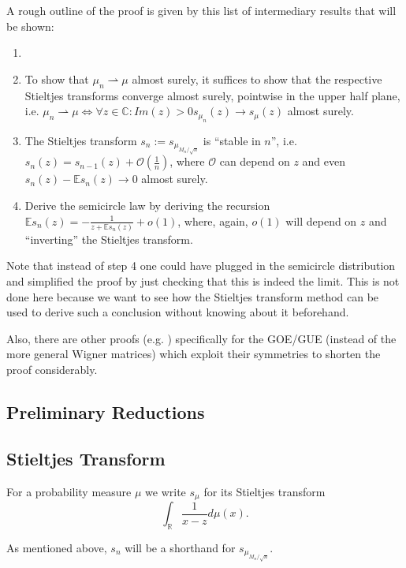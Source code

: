A rough outline of the proof is given by this list of intermediary results that will be shown:
\begin{enumerate}
	\item {}
	\item To show that $\mu_n\rightharpoonup\mu$ almost surely, it suffices to show that the respective Stieltjes transforms converge almost surely, pointwise in the upper half plane, i.e. $\mu_n\rightharpoonup\mu\Leftrightarrow\forall z\in\mathbb C:Im(z)>0 s_{\mu_n}(z)\rightarrow s_\mu(z)$ almost surely.
	\item The Stieltjes transform $s_n := s_{\mu_{M_n/\sqrt{n}}}$ is ``stable in $n$'', i.e. $s_n(z)=s_{n-1}(z)+\mathcal O(\frac{1}{n})$, where $\mathcal O$ can depend on $z$ and even $s_n(z)-\mathbb E s_n(z)\rightarrow 0$ almost surely.
	\item Derive the semicircle law by deriving the recursion $\mathbb E s_n(z)=-\frac{1}{z+\mathbb E s_n(z)}+o(1)$, where, again, $o(1)$ will depend on $z$ and ``inverting'' the Stieltjes transform.
\end{enumerate}
\begin{remark}
	Note that instead of step 4 one could have plugged in the semicircle distribution and simplified the proof by just checking that this is indeed the limit. This is not done here because we want to see how the Stieltjes transform method can be used to derive such a conclusion without knowing about it beforehand.
	
	Also, there are other proofs (e.g. \cite{scGOE}) specifically for the GOE/GUE (instead of the more general Wigner matrices) which exploit their symmetries to shorten the proof considerably.
\end{remark}

\subsection{Preliminary Reductions}

\subsection{Stieltjes Transform}

\begin{definition}
	For a probability measure $\mu$ we write $s_\mu$ for its Stieltjes transform $$\int_\mathbb{R} \frac{1}{x-z}d\mu(x).$$
\end{definition}
As mentioned above, $s_n$ will be a shorthand for $s_{\mu_{M_n/\sqrt{n}}}$.

